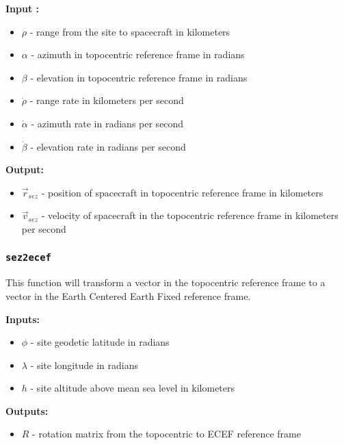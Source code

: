\documentclass[11pt, reqno]{article}    %
\begin{document}
\noindent \textbf{Input : }
\begin{itemize}
    \item \( \rho \) - range from the site to spacecraft in kilometers
    \item \( \alpha \) - azimuth in topocentric reference frame in radians
    \item \( \beta \) - elevation in topocentric reference frame in radians 
    \item \( \dot{\rho} \) - range rate in kilometers per second
    \item \( \dot{\alpha} \) - azimuth rate in radians per second
    \item \( \dot{\beta} \) - elevation rate in radians per second
\end{itemize}

\noindent \textbf{Output: }

\begin{itemize}
    \item \( \vec r_{sez} \) - position of spacecraft in topocentric reference frame in kilometers
    \item \( \vec v_{sez} \) - velocity of spacecraft in the topocentric reference frame in kilometers per second
\end{itemize}

\subsubsection*{\texttt{sez2ecef}}
This function will transform a vector in the topocentric reference frame to a vector in the Earth Centered Earth Fixed reference frame.

\noindent\textbf{Inputs:}
\begin{itemize}
    \item \( \phi \) - site geodetic latitude in radians
    \item \( \lambda \) - site longitude in radians
    \item \( h \) - site altitude above mean sea level in kilometers
\end{itemize}

\noindent \textbf{Outputs:}
\begin{itemize}
    \item \( R\) - rotation matrix from the topocentric to ECEF reference frame
\end{itemize}
\end{document}
